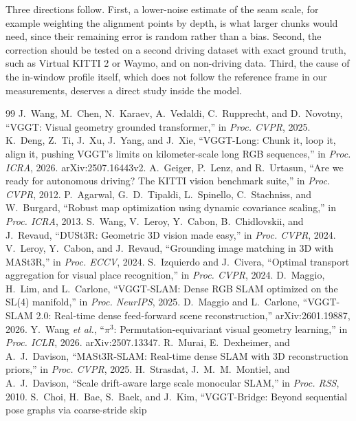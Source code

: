 \documentclass[conference]{IEEEtran}
\begin{document}
Three directions follow. First, a lower-noise estimate of the seam scale, for example weighting the alignment points by
depth, is what larger chunks would need, since their remaining error is random rather than a bias. Second, the
correction should be tested on a second driving dataset with exact ground truth, such as Virtual KITTI 2 or Waymo, and
on non-driving data. Third, the cause of the in-window profile itself, which does not follow the reference frame in our
measurements, deserves a direct study inside the model.

\begin{thebibliography}{99}
\footnotesize
{} J.~Wang, M.~Chen, N.~Karaev, A.~Vedaldi, C.~Rupprecht, and D.~Novotny, ``VGGT: Visual geometry grounded
transformer,'' in \emph{Proc. CVPR}, 2025.
 K.~Deng, Z.~Ti, J.~Xu, J.~Yang, and J.~Xie, ``VGGT-Long: Chunk it, loop it, align it, pushing VGGT's
limits on kilometer-scale long RGB sequences,'' in \emph{Proc. ICRA}, 2026. arXiv:2507.16443v2.
 A.~Geiger, P.~Lenz, and R.~Urtasun, ``Are we ready for autonomous driving? The KITTI vision benchmark
suite,'' in \emph{Proc. CVPR}, 2012.
 P.~Agarwal, G.~D.~Tipaldi, L.~Spinello, C.~Stachniss, and W.~Burgard, ``Robust map optimization using dynamic
covariance scaling,'' in \emph{Proc. ICRA}, 2013.
 S.~Wang, V.~Leroy, Y.~Cabon, B.~Chidlovskii, and J.~Revaud, ``DUSt3R: Geometric 3D vision made easy,'' in
\emph{Proc. CVPR}, 2024.
 V.~Leroy, Y.~Cabon, and J.~Revaud, ``Grounding image matching in 3D with MASt3R,'' in \emph{Proc. ECCV},
2024.
 S.~Izquierdo and J.~Civera, ``Optimal transport aggregation for visual place recognition,'' in \emph{Proc.
CVPR}, 2024.
 D.~Maggio, H.~Lim, and L.~Carlone, ``VGGT-SLAM: Dense RGB SLAM optimized on the SL(4) manifold,'' in
\emph{Proc. NeurIPS}, 2025.
 D.~Maggio and L.~Carlone, ``VGGT-SLAM 2.0: Real-time dense feed-forward scene reconstruction,''
arXiv:2601.19887, 2026.
 Y.~Wang \emph{et al.}, ``$\pi^3$: Permutation-equivariant visual geometry learning,'' in \emph{Proc. ICLR},
2026. arXiv:2507.13347.
 R.~Murai, E.~Dexheimer, and A.~J.~Davison, ``MASt3R-SLAM: Real-time dense SLAM with 3D reconstruction
priors,'' in \emph{Proc. CVPR}, 2025.
 H.~Strasdat, J.~M.~M.~Montiel, and A.~J.~Davison, ``Scale drift-aware large scale monocular SLAM,'' in
\emph{Proc. RSS}, 2010.
 S.~Choi, H.~Bae, S.~Baek, and J.~Kim, ``VGGT-Bridge: Beyond sequential pose graphs via coarse-stride skip

\end{thebibliography}
\end{document}
